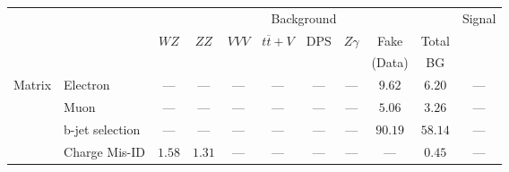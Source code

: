 \small\renewcommand{\tabcolsep}{4pt}
\begin{tabular}{|cl||ccccccc|c||c|}
\hline
 & & \multicolumn{8}{c||}{Background} & Signal\\ 
 & & $WZ$ & $ZZ$ & $VVV$ & $t\overline{t}+V$ & DPS & $Z\gamma$ & Fake & Total & \\ 
 & & &  &  &  &  &  & (Data) & BG & \\ 
\hline\hline
\multirow{2}{*}{Matrix}
& Electron &  --- &  --- &  --- &  --- &  --- &  --- & $9.62$& $6.20$&  ---\\ 
\cline{2-11}
\multirow{2}{*}{Method}
& Muon &  --- &  --- &  --- &  --- &  --- &  --- & $5.06$& $3.26$&  ---\\ 
\cline{2-11}
& b-jet selection &  --- &  --- &  --- &  --- &  --- &  --- & $90.19$& $58.14$&  ---\\ 
\hline
& Charge Mis-ID & $1.58$& $1.31$&  --- &  --- &  --- &  --- &  --- & $0.45$&  ---\\ 
\hline
\end{tabular}
